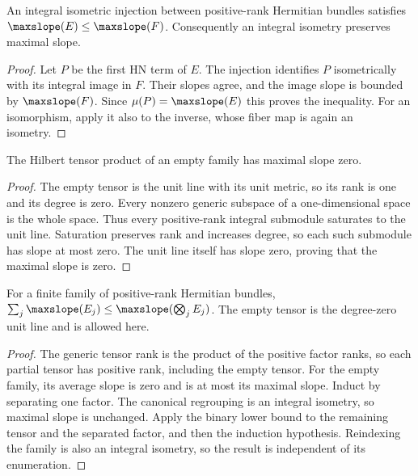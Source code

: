 \begin{lemma}
\label{lem:max-slope-isometry}
\leanok
An integral isometric injection between positive-rank Hermitian bundles
satisfies $\maxslope(E)\leq\maxslope(F)$. Consequently an integral
isometry preserves maximal slope.
\end{lemma}
\begin{proof}
Let $P$ be the first HN term of $E$. The injection identifies $P$
isometrically with its integral image in $F$. Their slopes agree,
and the image slope is bounded by $\maxslope(F)$. Since
$\mu(P)=\maxslope(E)$ this proves the inequality. For an isomorphism,
apply it also to the inverse, whose fiber map is again an isometry.
\end{proof}

\begin{lemma}
\label{lem:max-slope-tensor-unit}
\leanok
The Hilbert tensor product of an empty family has maximal slope zero.
\end{lemma}
\begin{proof}
The empty tensor is the unit line with its unit metric, so its rank is one
and its degree is zero. Every nonzero generic subspace of a one-dimensional
space is the whole space. Thus every positive-rank integral submodule
saturates to the unit line. Saturation preserves rank and increases degree,
so each such submodule has slope at most zero. The unit line itself has
slope zero, proving that the maximal slope is zero.
\end{proof}

\begin{lemma}
\label{lem:max-slope-finite-lower}
\leanok
For a finite family of positive-rank Hermitian bundles,
$\sum_j\maxslope(E_j)\leq\maxslope(\bigotimes_j E_j)$.
The empty tensor is the degree-zero unit line and is allowed here.
\end{lemma}
\begin{proof}
The generic tensor rank is the product of the positive factor ranks,
so each partial tensor has positive rank, including the empty tensor.
For the empty family, its average slope is zero and is at most its
maximal slope. Induct by separating one factor. The canonical
regrouping is an integral isometry, so maximal slope is unchanged.
Apply the binary lower bound to the remaining tensor and the separated
factor, and then the induction hypothesis. Reindexing the family is
also an integral isometry, so the result is independent of its enumeration.
\end{proof}


